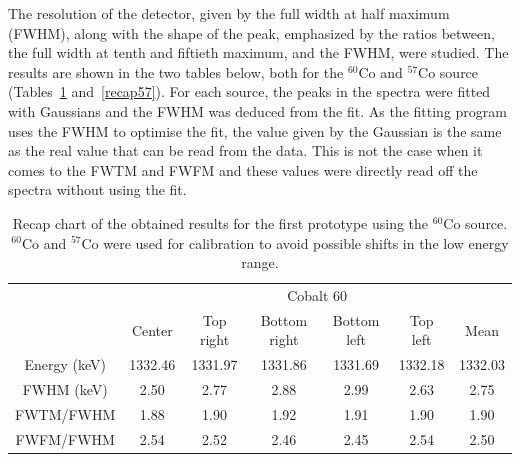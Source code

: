 \documentclass[11pt,a4paper]{article}
\begin{document}
The resolution of the detector, given by the full width at half maximum (FWHM), along with the shape of the peak, emphasized by the ratios between, the full width at tenth and fiftieth maximum, and the FWHM, were studied. The results are shown in the two tables below, both for the $^{60}$Co and $^{57}$Co source (Tables~\ref{recap60} and~\ref{recap57}). For each source, the peaks in the spectra were fitted with Gaussians and the FWHM was deduced from the fit. As the fitting program uses the FWHM to optimise the fit, the value given by the Gaussian is the same as the real value that can be read from the data. This is not the case when it comes to the FWTM and FWFM and these values were directly read off the spectra without using the fit.

\begin{table}[!h]
\centering
\caption{Recap chart of the obtained results for the first prototype using the $^{60}$Co source. $^{60}$Co and $^{57}$Co were used for calibration to avoid possible shifts in the low energy range.}
\label{recap60}
\begin{tabular}{c|c|c|c|c|c|c|}
\cline{2-7}
                                   & \multicolumn{6}{c|}{Cobalt 60}                                        \\ \cline{2-7} 
                                   & Center  & Top right & Bottom right & Bottom left & Top left & Mean    \\ \hline
\multicolumn{1}{|c|}{Energy (keV)} & 1332.46 & 1331.97   & 1331.86      & 1331.69     & 1332.18  & 1332.03 \\ \hline
\multicolumn{1}{|c|}{FWHM (keV)}   & 2.50    & 2.77      & 2.88         & 2.99        & 2.63     & 2.75    \\ \hline
\multicolumn{1}{|c|}{FWTM/FWHM}    & 1.88    & 1.90      & 1.92         & 1.91        & 1.90     & 1.90    \\ \hline
\multicolumn{1}{|c|}{FWFM/FWHM}    & 2.54    & 2.52      & 2.46         & 2.45        & 2.54     & 2.50    \\ \hline
\end{tabular}
\end{table}
\end{document}
